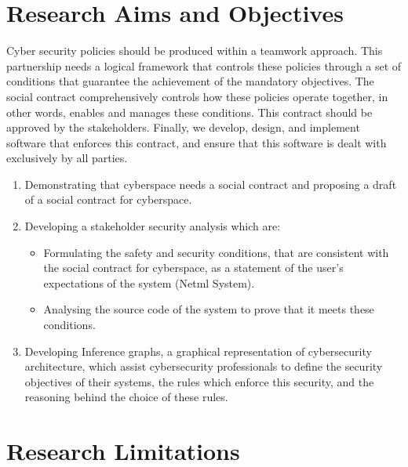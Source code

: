 \section{Research Aims and Objectives}
Cyber security policies should be produced within a teamwork approach.  This partnership needs a logical framework that controls these policies through a set of conditions that guarantee the achievement of the mandatory objectives.  The social contract comprehensively controls how these policies operate together, in other words, enables and manages these conditions.  This contract should be approved by the stakeholders. Finally, we develop, design, and implement software that enforces this contract, and ensure that this software is dealt with exclusively by all parties.
\begin{enumerate}
\item Demonstrating that cyberspace needs a social contract and proposing a draft of a social contract for cyberspace.
\item Developing a stakeholder security analysis which are: 
\begin{itemize}
\item Formulating the safety and security conditions, that are consistent with the social contract for cyberspace, as a statement of the user’s expectations of the system (Netml System).
\item Analysing the source code of the system to prove that it meets these conditions.
\end{itemize}
\item Developing Inference graphs, a graphical representation of cybersecurity architecture, which assist cybersecurity professionals to define the security objectives of their systems, the rules which enforce this security, and the reasoning behind the choice of these rules.
\end{enumerate}
\section{Research Limitations}
